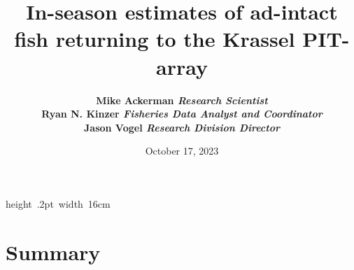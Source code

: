 \documentclass[11pt,a4paper,]{article}
\title{In-season estimates of ad-intact fish returning to the Krassel PIT-array \vspace{0.5cm}}
\author{\Large \bf{Mike Ackerman}\vspace{0.05in} \newline\normalsize\emph{Research Scientist}   \vspace{0.05in} \\ \Large \bf{Ryan N. Kinzer}\vspace{0.05in} \newline\normalsize\emph{Fisheries Data Analyst and Coordinator}   \vspace{0.05in} \\ \Large \bf{Jason Vogel}\vspace{0.05in} \newline\normalsize\emph{Research Division Director}  }
\date{October 17, 2023}
\begin{document}
  \vspace*{0cm}
  \begin{snugshade}%
  \maketitle
  \end{snugshade}\vspace*{0.5cm}

\hbox{\vrule height .2pt width 16cm}




\hypertarget{summary}{%
\section{Summary}\label{summary}}
\end{document}
